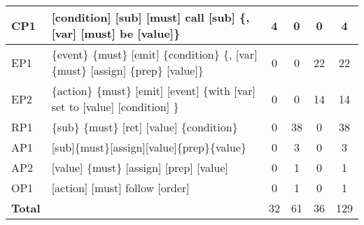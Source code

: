 \begin{table}[t]
\begin{tabular}{|l|p{}|c|c|c|c|}
    CP1 & [condition] [sub] [must] call [sub] \{, [var] [must] be [value]\}       & 4   & 0 & 0   & 4    \\ \hline
    EP1 & \{event\} \{must\} [emit] \{condition\} \{, [var] \{must\} [assign] \{prep\} [value]\}                      & 0   & 0 &  22   &     22    \\ \hline
    EP2 & \{action\} \{must\} [emit] [event] \{with [var] set to [value] [condition] \}                      & 0   & 0 &  14  & 14         \\ \hline
    RP1 & \{sub\} \{must\} [ret] [value] \{condition\}                                  &  0  & 38 & 0&   38     \\ \hline
    AP1 & [sub]\{must\}[assign][value]\{prep\}\{value\}            & 0 & 3 & 0 &  3        \\ \hline
    AP2 & [value] \{must\} [assign] [prep] [value]            & 0 & 1 & 0 &  1        \\ \hline
    OP1 & [action] [must] follow [order]             & 0 & 1 & 0 &  1        \\ \hline \hline

    
{\textbf{Total}}  &  & 32 &  61 &  36 & 129 \\ \hline 
\end{tabular}
\end{table}